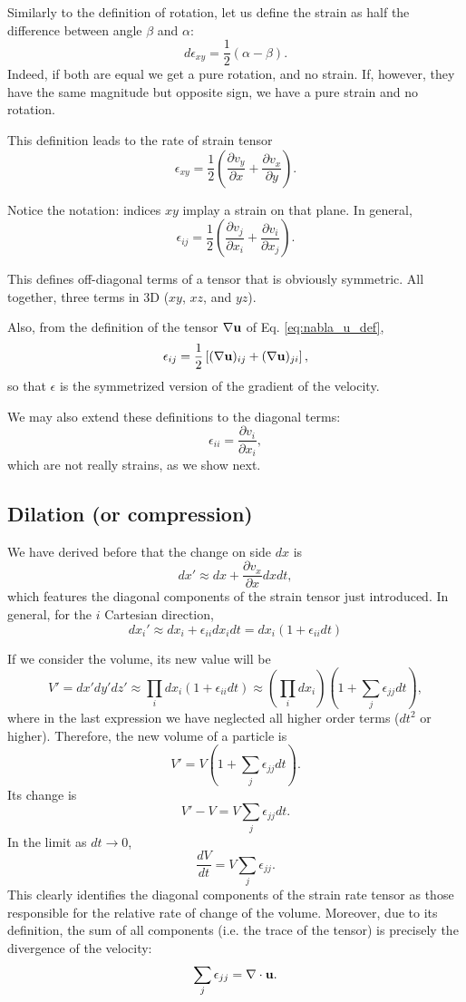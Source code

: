 Similarly to the definition of rotation, let us define the strain as
half the difference between angle $\beta$ and $\alpha$:
\[
d\epsilon_{xy} = \frac12
\left(
        \alpha - \beta
\right) .
\]
Indeed, if both are equal we get a pure rotation, and no strain. If,
however, they have the same magnitude but opposite sign, we have a pure
strain and no rotation.

This definition leads to the rate of strain tensor
\[
\epsilon_{xy} = \frac12
\left(
  \frac{\partial v_y}{\partial x}  +
  \frac{\partial v_x}{\partial y}
\right) .
\]

Notice the notation: indices $xy$ implay a strain on that plane. In general,
\[
\epsilon_{ij} = \frac12
\left(
  \frac{\partial v_j}{\partial x_i}  +
  \frac{\partial v_i}{\partial x_j}
\right) .
\]

This defines off-diagonal terms of a tensor that is obviously
symmetric. All together, three terms in 3D ($xy$, $xz$, and $yz$).

Also, from the definition of the tensor $\nabla \mathbf{u}$ of
Eq. \ref{eq:nabla_u_def},
\begin{equation}
  \label{eq:epsilon_as_grad_u}
  \epsilon_{ij} = \frac12
  \left[
    (\nabla \mathbf{u})_{ij} +
    (\nabla \mathbf{u})_{ji}
  \right] ,
\end{equation}
so that $\epsilon$ is the symmetrized version of the gradient of the
velocity.

We may also extend these definitions to the diagonal terms:
\[
  \epsilon_{ii} =   \frac{\partial v_i}{\partial x_i} ,
\]
which are not really strains, as we show next.

\subsection{Dilation (or compression)}

We have derived before that the change on side $dx$ is
\[
dx' \approx  dx + \frac{\partial v_x}{\partial x} dx dt ,
\]
which features the diagonal components of the strain tensor just
introduced. In general, for the $i$ Cartesian direction,
\[
dx_i' \approx dx_i + \epsilon_{ii} dx_i dt = dx_i
\left(
1+\epsilon_{ii} dt
\right)
\]

If we consider the volume, its new value will be
\[
V'= dx' dy' dz'  \approx  \prod_i  dx_i \left( 1+\epsilon_{ii} dt \right)
\approx \left(\prod_i  dx_i \right) \left( 1 + \sum_j  \epsilon_{jj} dt \right) ,
\]
where in the last expression we have neglected all higher order terms
($dt^2$ or higher). Therefore, the new volume of a particle is
\[
V' = V \left( 1 + \sum_j  \epsilon_{jj} dt \right) .
\]
Its change is
\[
V'-V =  V \sum_j  \epsilon_{jj} dt .
\]
In the limit as $dt\to 0$,
\[
\frac{d V}{dt} = V \sum_j  \epsilon_{jj} .
\]
This clearly identifies the diagonal components of the strain rate tensor
as those responsible for the relative rate of change of the volume.
Moreover, due to its definition, the sum of all components (i.e. the
trace of the tensor) is precisely the divergence of the velocity:
\[
\sum_j  \epsilon_{jj} = \nabla\cdot \mathbf{u} .
\]

